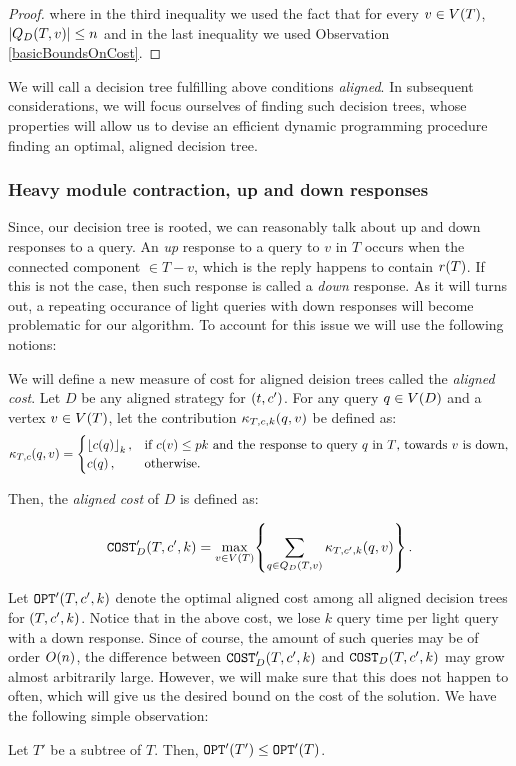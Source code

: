 \begin{lemma}
\begin{proof}
        where in the third inequality we used the fact that for every $v\in V\mathopen{}\left( T \right)$, $\mathopen{}\left| Q_{D}\mathopen{}\left( T,v \right) \right|\leq n$ and in the last inequality we used Observation \ref{basicBoundsOnCost}.
    \end{proof}
\end{lemma}

We will call a decision tree fulfilling above conditions \textit{aligned}. In subsequent considerations, we will focus ourselves of finding such decision trees, whose properties will allow us to devise an efficient dynamic programming procedure finding an optimal, aligned decision tree. 

\subsubsection{Heavy module contraction, up and down responses}
Since, our decision tree is rooted, we can reasonably talk about up and down responses to a query. An \textit{up} response to a query to $v$ in $T$ occurs when the connected component $\in T-v$, which is the reply happens to contain $r\mathopen{}\left( T \right)$. If this is not the case, then such response is called a \textit{down} response. As it will turns out, a repeating occurance of light queries with down responses will become problematic for our algorithm. To account for this issue we will use the following notions:

We will define a new measure of cost for aligned deision trees called the \textit{aligned cost}. Let $D$ be any aligned strategy for $\mathopen{}\left( t,c' \right)$. For any query $q\in V\mathopen{}\left( D \right)$ and a vertex $v\in V\mathopen{}\left( T \right)$, let the contribution $\kappa_{T,c,k}\mathopen{}\left( q,v \right)$ be defined as:
$$
\kappa_{T,c}\mathopen{}\left( q, v \right)= \begin{cases}
    \mathopen{}\left\lfloor c\mathopen{}\left( q \right) \right\rfloor_k, & \text{if } c\mathopen{}\left( v \right)\leq pk \text{ and the response to query $q$ in $T$, towards $v$ is down},\\
    c\mathopen{}\left( q \right), & \text{otherwise}.
\end{cases}
$$

Then, the \textit{aligned cost} of $D$ is defined as:

$$
\texttt{COST}'_D\mathopen{}\left( T,c',k \right)=\max_{v\in V\mathopen{}\left( T \right)}\mathopen{}\left\{ \sum_{q\in Q_D\mathopen{}\left( T,v \right)}\kappa_{T,c', k}\mathopen{}\left( q,v \right) \right\}.
$$

Let $\texttt{OPT}'\mathopen{}\left( T,c',k \right)$ denote the optimal aligned cost among all aligned decision trees for $\mathopen{}\left( T,c',k \right)$.
Notice that in the above cost, we lose $k$ query time per light query with a down response. Since of course, the amount of such queries may be of order $O\mathopen{}\left( n \right)$, the difference between $\texttt{COST}'_D\mathopen{}\left( T,c',k \right)$ and $\texttt{COST}_D\mathopen{}\left( T,c',k \right)$ may grow almost arbitrarily large. However, we will make sure that this does not happen to often, which will give us the desired bound on the cost of the solution. We have the following simple observation:
\begin{observation}\label{aligned_subtree_opt_observation}
    Let $T'$ be a subtree of $T$. Then, $\texttt{OPT}'\mathopen{}\left( T' \right)\leq\texttt{OPT}'\mathopen{}\left( T \right)$.
\end{observation}

